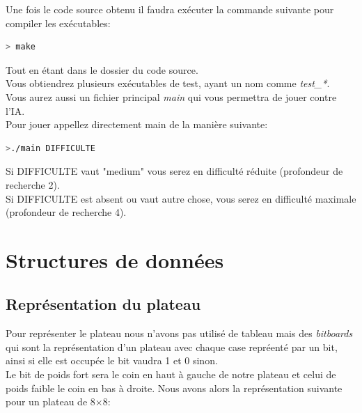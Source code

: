 \documentclass{article}
\begin{document}
Une fois le code source obtenu il faudra exécuter la commande suivante pour compiler les exécutables:
\begin{lstlisting}[language=bash]
	> make
\end{lstlisting}

Tout en étant dans le dossier du code source.\\

Vous obtiendrez plusieurs exécutables de test, ayant un nom comme \textit{test\_*}.\\
Vous aurez aussi un fichier principal \textit{main} qui vous permettra de jouer contre l'IA.\\

Pour jouer appellez directement main de la manière suivante:
\begin{lstlisting}[language=bash]
	>./main DIFFICULTE
\end{lstlisting}
Si DIFFICULTE vaut "medium" vous serez en difficulté réduite (profondeur de recherche 2).\\
Si DIFFICULTE est absent ou vaut autre chose, vous serez en difficulté maximale (profondeur de recherche 4).
\pagebreak
\section{Structures de données}
\subsection{Représentation du plateau}

Pour représenter le plateau nous n'avons pas utilisé de tableau mais des \textit{bitboards} qui
sont la représentation d'un plateau avec chaque case repréenté par un bit, ainsi si elle est
occupée le bit vaudra 1 et 0 sinon.\\
Le bit de poids fort sera le coin en haut à gauche de notre plateau et celui de poids faible le coin 
en bas à droite. Nous avons alors la représentation suivante pour un plateau de 8$\times$8:
\end{document}
